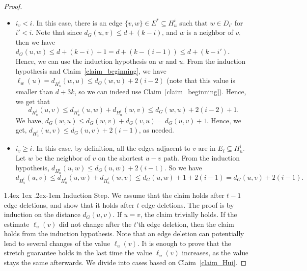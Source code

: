 \documentclass[11pt]{article}
\makeatletter
\theoremstyle{definition}
\theoremstyle{remark}
\newcommand{\mtodo}[1]{\todo[color=red!20]{M: #1}}
\renewcommand{\paragraph}{%
  \@startsection{paragraph}{4}%
  {\z@}{1.4ex \@plus 1ex \@minus .2ex}{-1em}%
  {\normalfont\normalsize\bfseries}%
}
\makeatother
\begin{document}
\begin{proof}
\begin{itemize}
    \item [Case 1:] $i_v < i$. In this case, there is an edge $\{v,w\} \in E^* \subseteq H_u^i$ such that $w \in D_{i'}$ for $i' < i$. Note that since $d_G(u,v) \leq d+(k-i)$, and $w$ is a neighbor of $v$, then we have $d_G(u,w) \leq d +(k-i)+1 = d+(k-(i-1)) \leq d+(k-i')$. Hence, we can use the induction hypothesis on $w$ and $u$. From the induction hypothesis and Claim~\ref{claim_beginning}, we have 
    $\ell_w(u) = d_{H_u^i}(w,u) \leq d_G(w,u)+2(i-2)$ (note that this value is smaller than $d+3k$, so we can indeed use Claim~\ref{claim_beginning}). 
    Hence, we get that $$d_{H_u^i}(u,v) \leq d_{H_u^i}(u,w) + d_{H_u^i}(w,v) \leq d_G(w,u) + 2(i-2)+1.$$ We have, $d_G(w,u) \leq d_G(w,v)+d_G(v,u)=d_G(u,v)+1$.
    Hence, we get, $d_{H_u^i}(u,v) \leq d_G(u,v)+2(i-1)$, as needed.
    \item [Case 2:] $i_v \geq i$. In this case, by definition, all the edges adjacent to $v$ are in $E_i \subseteq H_u^i$. Let $w$ be the neighbor of $v$ on the shortest $u-v$ path. From the induction hypothesis, $d_{H_u^i}(u,w) \leq d_G(u,w)+2(i-1)$. So we have $$d_{H_u^i}(u,v) \leq d_{H_u^i}(u,w)+d_{H_u^i}(w,v) \leq d_G(u,w)+1+2(i-1)=d_G(u,v)+2(i-1).$$
\end{itemize}


\paragraph{Induction Step.} We assume that the claim holds after $t-1$ edge deletions, and show that it holds after $t$ edge deletions. The proof is by induction on the distance $d_G(u,v)$. If $u=v$, the claim trivially holds. If the estimate $\ell_u(v)$ did not change after the $t$'th edge deletion, then the claim holds from the induction hypothesis. Note that an edge deletion can potentially lead to several changes of the value $\ell_u(v)$. It is enough to prove that the stretch guarantee holds in the last time the value $\ell_u(v)$ increases, as the value stays the same afterwards. We divide into cases based on Claim~\ref{claim_Hui}.


\end{proof}
\end{document}
